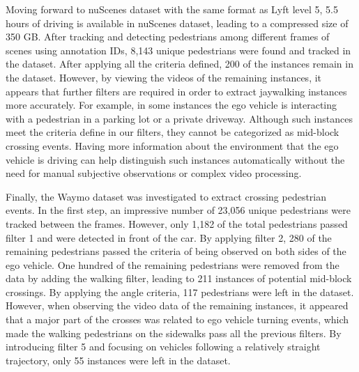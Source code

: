 Moving forward to nuScenes dataset with the same format as Lyft level 5, 5.5 hours of driving is available in nuScenes dataset, leading to a compressed size of 350 GB. After tracking and detecting pedestrians among different frames of scenes using annotation IDs, 8,143 unique pedestrians were found and tracked in the dataset. After applying all the criteria defined, 200 of the instances remain in the dataset. However, by viewing the videos of the remaining instances, it appears that further filters are required in order to extract jaywalking instances more accurately. For example, in some instances the ego vehicle is interacting with a pedestrian in a parking lot or a private driveway. Although such instances meet the criteria define in our filters, they cannot be categorized as mid-block crossing events. Having more information about the environment that the ego vehicle is driving can help distinguish such instances automatically without the need for manual subjective observations or complex video processing. 

Finally, the Waymo dataset was investigated to extract crossing pedestrian events. In the first step, an impressive number of 23,056 unique pedestrians were tracked between the frames. However, only 1,182 of the total pedestrians passed filter 1 and were detected in front of the car. By applying filter 2, 280 of the remaining pedestrians passed the criteria of being observed on both sides of the ego vehicle. One hundred of the remaining pedestrians were removed from the data by adding the walking filter, leading to 211 instances of potential mid-block crossings. By applying the angle criteria, 117 pedestrians were left in the dataset. However, when observing the video data of the remaining instances, it appeared that a major part of the crosses was related to ego vehicle turning events, which made the walking pedestrians on the sidewalks pass all the previous filters. By introducing filter 5 and focusing on vehicles following a relatively straight trajectory, only 55 instances were left in the dataset.


